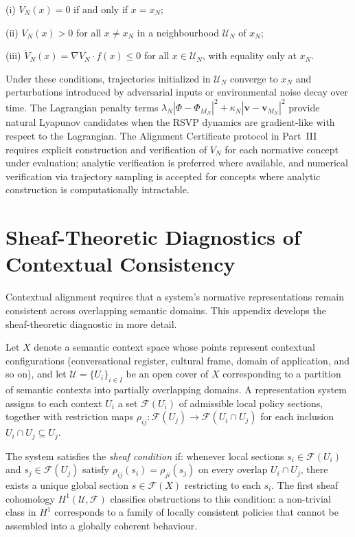 \documentclass[12pt]{article}
\theoremstyle{definition}
\begin{document}
(i) $V_N(x) = 0$ if and only if $x = x_N$;

(ii) $V_N(x) > 0$ for all $x \neq x_N$ in a neighbourhood $\mathcal{U}_N$
of $x_N$;

(iii) $\dot{V}_N(x) = \nabla V_N \cdot f(x) \leq 0$ for all $x \in
\mathcal{U}_N$, with equality only at $x_N$.

Under these conditions, trajectories initialized in $\mathcal{U}_N$ converge
to $x_N$ and perturbations introduced by adversarial inputs or environmental
noise decay over time. The Lagrangian penalty terms
$\lambda_N |\Phi - \Phi_{M_N}|^2 + \kappa_N |\mathbf{v} - \mathbf{v}_{M_N}|^2$
provide natural Lyapunov candidates when the RSVP dynamics are gradient-like
with respect to the Lagrangian. The Alignment Certificate protocol in Part~III
requires explicit construction and verification of $V_N$ for each normative
concept under evaluation; analytic verification is preferred where available,
and numerical verification via trajectory sampling is accepted for concepts
where analytic construction is computationally intractable.

\section{Sheaf-Theoretic Diagnostics of Contextual Consistency}
\label{app:sheaf}

Contextual alignment requires that a system's normative representations remain
consistent across overlapping semantic domains. This appendix develops the
sheaf-theoretic diagnostic in more detail.

Let $X$ denote a semantic context space whose points represent contextual
configurations (conversational register, cultural frame, domain of application,
and so on), and let $\mathcal{U} = \{U_i\}_{i \in I}$ be an open cover of $X$
corresponding to a partition of semantic contexts into partially overlapping
domains. A representation system assigns to each context $U_i$ a set
$\mathcal{F}(U_i)$ of admissible local policy sections, together with
restriction maps $\rho_{ij} : \mathcal{F}(U_j) \to \mathcal{F}(U_i \cap U_j)$
for each inclusion $U_i \cap U_j \subseteq U_j$.

The system satisfies the \emph{sheaf condition} if: whenever local sections
$s_i \in \mathcal{F}(U_i)$ and $s_j \in \mathcal{F}(U_j)$ satisfy
$\rho_{ij}(s_i) = \rho_{ji}(s_j)$ on every overlap $U_i \cap U_j$, there
exists a unique global section $s \in \mathcal{F}(X)$ restricting to each
$s_i$. The first sheaf cohomology $H^1(\mathcal{U}, \mathcal{F})$ classifies
obstructions to this condition: a non-trivial class in $H^1$ corresponds to a
family of locally consistent policies that cannot be assembled into a globally
coherent behaviour.
\end{document}
